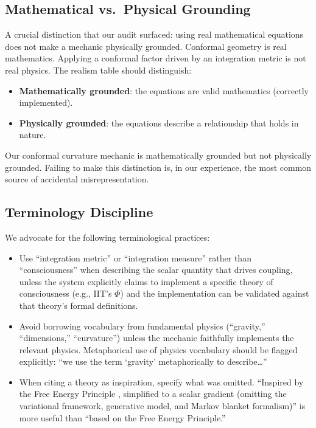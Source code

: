 \documentclass[12pt,a4paper]{article}
\begin{document}
\subsection{Mathematical vs.\ Physical Grounding}

A crucial distinction that our audit surfaced: using real
mathematical equations does not make a mechanic physically
grounded.  Conformal geometry is real mathematics.  Applying a
conformal factor driven by an integration metric is not real
physics.  The realism table should distinguish:

\begin{itemize}
  \item \textbf{Mathematically grounded}: the equations are
    valid mathematics (correctly implemented).
  \item \textbf{Physically grounded}: the equations describe
    a relationship that holds in nature.
\end{itemize}

Our conformal curvature mechanic is mathematically grounded
but not physically grounded.  Failing to make this distinction
is, in our experience, the most common source of accidental
misrepresentation.

\subsection{Terminology Discipline}

We advocate for the following terminological practices:

\begin{itemize}
  \item Use ``integration metric'' or ``integration measure''
    rather than ``consciousness'' when describing the scalar
    quantity that drives coupling, unless the system explicitly
    claims to implement a specific theory of consciousness
    (e.g., IIT's $\Phi$) and the implementation can be validated
    against that theory's formal definitions.
  \item Avoid borrowing vocabulary from fundamental physics
    (``gravity,'' ``dimensions,'' ``curvature'') unless the
    mechanic faithfully implements the relevant physics.
    Metaphorical use of physics vocabulary should be flagged
    explicitly: ``we use the term `gravity' metaphorically
    to describe\ldots''
  \item When citing a theory as inspiration, specify what was
    omitted.  ``Inspired by the Free Energy Principle
    \citep{friston2010}, simplified to a scalar gradient
    (omitting the variational framework, generative model,
    and Markov blanket formalism)'' is more useful than
    ``based on the Free Energy Principle.''
\end{itemize}
\end{document}
